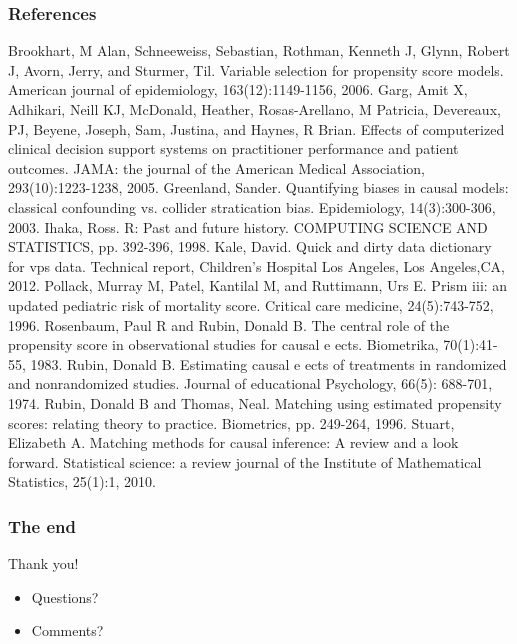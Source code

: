 \documentclass{beamer}
\begin{document}
\begin{frame}
\frametitle{References}
\fontsize{1mm}{0.1mm}\selectfont
[1] Brookhart, M Alan, Schneeweiss, Sebastian, Rothman, Kenneth J, Glynn, Robert J, Avorn, Jerry, and Sturmer, Til. Variable selection for propensity score models. American journal of epidemiology, 163(12):1149-1156, 2006.
\newline [2] Garg, Amit X, Adhikari, Neill KJ, McDonald, Heather, Rosas-Arellano, M Patricia, Devereaux, PJ, Beyene, Joseph, Sam, Justina, and Haynes, R Brian. Effects of computerized clinical decision support systems on practitioner performance and patient outcomes. JAMA: the journal of the American Medical Association, 293(10):1223-1238, 2005.
\newline [3] Greenland, Sander. Quantifying biases in causal models: classical confounding vs. collider stratication bias. Epidemiology, 14(3):300-306, 2003.
\newline [4] Ihaka, Ross. R: Past and future history. COMPUTING SCIENCE AND STATISTICS, pp. 392-396, 1998.
\newline [5] Kale, David. Quick and dirty data dictionary for vps data. Technical report, Children's Hospital Los Angeles, Los Angeles,CA, 2012.
\newline [6] Pollack, Murray M, Patel, Kantilal M, and Ruttimann, Urs E. Prism iii: an updated pediatric risk of mortality score. Critical care medicine, 24(5):743-752, 1996.
\newline [7] Rosenbaum, Paul R and Rubin, Donald B. The central role of the propensity score in observational studies for causal e ects. Biometrika, 70(1):41-55, 1983.
\newline [8] Rubin, Donald B. Estimating causal e ects of treatments in randomized and nonrandomized studies. Journal of educational Psychology, 66(5): 688-701, 1974.
\newline [9] Rubin, Donald B and Thomas, Neal. Matching using estimated propensity scores: relating theory to practice. Biometrics, pp. 249-264, 1996.
\newline [10] Stuart, Elizabeth A. Matching methods for causal inference: A review and a look forward. Statistical science: a review journal of the Institute of Mathematical Statistics, 25(1):1, 2010.
\end{frame}
\begin{frame}
\frametitle{The end}
\Huge{\centerline{Thank you!}}   
\fontsize{5mm}{4mm}
\begin{itemize}
\item Questions?
\item Comments?
\end{itemize}
\end{frame}
\end{document}
